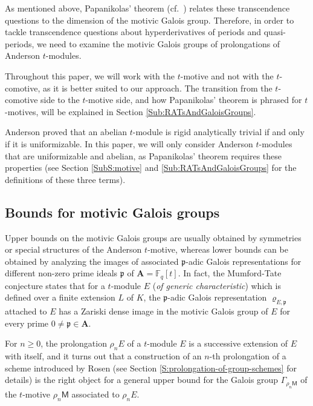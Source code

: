 \documentclass[10pt,a4paper]{amsart}
\theoremstyle{plain} %
\theoremstyle{definition}
\theoremstyle{remark}
\newcommand{\FF}{\mathbb{F}}
\newcommand{\fp}{\mathfrak{p}}  %
\newcommand{\bA}{\mathbf{A}}
\newcommand{\Fq}{\FF_{\!q}}  %
\newcommand{\mot}{\mathsf{M}}  %
\numberwithin{equation}{subsection}
\begin{document}
As mentioned above, Papanikolas' theorem (cf.~\cite[Theorem 1.1.7]{mp:tdadmaicl}) relates these transcendence questions to the dimension of the motivic Galois group.
Therefore, in order to tackle transcendence questions about hyperderivatives of periods and quasi-periods, we need to examine the motivic Galois groups of prolongations of Anderson $t$-modules.

Throughout this paper, we will work with the $t$-motive  and not with the $t$-comotive, as it is better suited to our approach. The transition from the $t$-comotive side to the $t$-motive side, and how Papanikolas' theorem is phrased for $t$-motives, will be explained in Section \ref{Sub:RATsAndGaloisGroups}.


Anderson \cite{ga:tm} proved that an abelian $t$-module is rigid analytically trivial if and only if it is uniformizable. In this paper, we will only consider Anderson $t$-modules that are uniformizable and abelian, as Papanikolas' theorem requires these properties (see Section \ref{SubS:motive} and \ref{Sub:RATsAndGaloisGroups} for the definitions of these three terms). 


\subsection{Bounds for motivic Galois groups}\label{Sub:BMGG}
Upper bounds on the motivic Galois groups are usually obtained by symmetries or special structures of the Anderson $t$-motive, whereas lower bounds can be obtained by analyzing the images of associated $\fp$-adic Galois representations for different non-zero prime ideals $\fp$ of $\bA=\Fq[t]$. In fact, the Mumford-Tate conjecture states that for a $t$-module $E$ (\emph{of generic characteristic}) which is defined over a finite extension $L$ of $K$, the $\fp$-adic Galois representation $\varrho_{E,\fp}$ attached to $E$ has a Zariski dense image in the motivic Galois group of $E$ for every prime $0 \ne \fp \in \bA$.

\medskip



For $n \geq 0$, the prolongation $\rho_{n}E$ of a $t$-module $E$ is a successive extension of $E$ with itself, and it turns out that a construction of an $n$-th prolongation of a scheme introduced by Rosen (see Section \ref{S:prolongation-of-group-schemes} for details) is the right object for a general upper bound for the Galois group $\Gamma_{\rho_n\mot}$ of the $t$-motive $\rho_n\mot$ associated to $\rho_{n}E$.
\end{document}
